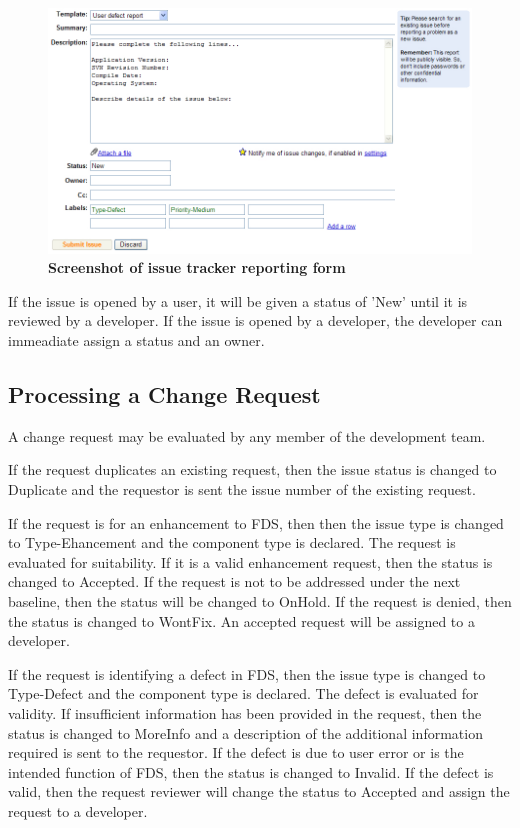 \documentclass[11pt]{book}
\begin{document}
\begin{figure}[ht!]
\includegraphics[width=\textwidth]{FIGURES/defectreport.jpg}
\caption{\bf Screenshot of issue tracker reporting form}
\label{fig:issueform}
\end{figure}

If the issue is opened by a user, it will be given a status of 'New' until it is reviewed by a developer.  If the
issue is opened by a developer, the developer can immeadiate assign a status and an owner.

\subsection{Processing a Change Request}

A change request may be evaluated by any member of the development team. 

If the request duplicates an existing request, then the issue status is changed to {\ct Duplicate} and the 
requestor is sent the issue number of the existing request.

If the request is for an enhancement to FDS, then then the issue type is changed to {\ct Type-Ehancement} and the
component type is declared. The request is evaluated for suitability.  If it is a valid enhancement 
request, then the status is changed to {\ct Accepted}.  If the request is not to
be addressed under the next baseline, then the status will be changed to {\ct OnHold}.  If the request is denied, then
the status is changed to {\ct WontFix}.  An accepted request will be assigned to a developer.

If the request is identifying a defect in FDS, then the issue type is changed to {\ct Type-Defect} and the
component type is declared.  The defect is evaluated for validity.  If insufficient information has
been provided in the request, then the status is changed to {\ct MoreInfo} and a description of the additional 
information required is sent to the requestor.  If the defect is due to user error or is the intended function of FDS,
then the status is changed to {\ct Invalid}.  If the defect is valid, then the request reviewer will change the 
status to {\ct Accepted} and assign the request to a developer.
\end{document}
